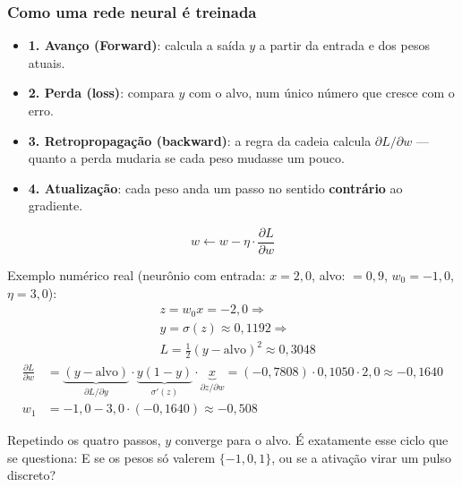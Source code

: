\begin{frame}[shrink]
	\frametitle{Como uma rede neural é treinada}
	\small
	\setlength{\abovedisplayskip}{1pt}
	\setlength{\belowdisplayskip}{1pt}
	\begin{itemize}
		\item \textbf{1. Avanço (Forward)}: calcula a saída $y$ a partir da entrada e dos pesos atuais.
		\item \textbf{2. Perda (loss)}: compara $y$ com o alvo, num único número que cresce com o erro.
		\item \textbf{3. Retropropagação (backward)}: a regra da cadeia calcula $\partial L/\partial w$ --- quanto a perda mudaria se cada peso mudasse um pouco.
		\item \textbf{4. Atualização}: cada peso anda um passo no sentido \textbf{contrário} ao gradiente.
	\end{itemize}
	\begin{equation*}
		w \leftarrow w - \eta \cdot \frac{\partial L}{\partial w}
	\end{equation*}
	\par Exemplo numérico real (neurônio com entrada: $x=2{,}0$, alvo: $=0{,}9$, $w_0=-1{,}0$, $\eta=3{,}0$):
	\begin{equation*}
		\begin{aligned}
			& z = w_0 x = -2{,}0 \Rightarrow \\
			& y = \sigma(z) \approx 0{,}1192 \Rightarrow \\
			& L = \tfrac12(y-\text{alvo})^2 \approx 0{,}3048
		\end{aligned}
	\end{equation*}
	\begin{equation*}
		\begin{aligned}
			\frac{\partial L}{\partial w} & =
			\underbrace{(y-\text{alvo})}_{\partial L/\partial y} \!\cdot\!
			\underbrace{y(1-y)}_{\sigma'(z)} \!\cdot\!
			\underbrace{x}_{\partial z/\partial w}
			= (-0{,}7808) \cdot 0{,}1050 \cdot 2{,}0 \approx -0{,}1640 \\
			w_1 & = -1{,}0 - 3{,}0 \cdot(-0{,}1640) \approx -0{,}508
		\end{aligned}
	\end{equation*}
	\par Repetindo os quatro passos, $y$ converge para o alvo. É exatamente esse ciclo que se questiona: E se os pesos só valerem $\{-1,0,1\}$, ou se a ativação virar um pulso discreto?
\end{frame}
